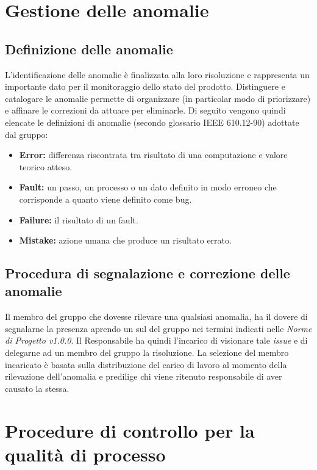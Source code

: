 \documentclass[openany,12pt,a4paper]{report}
\begin{document}
\section{Gestione delle anomalie}

\subsection{Definizione delle anomalie}

L’identificazione delle anomalie è finalizzata alla loro risoluzione e rappresenta un importante dato per il monitoraggio dello stato del prodotto. Distinguere e catalogare le anomalie permette di organizzare (in particolar modo di priorizzare) e affinare le correzioni da attuare per eliminarle. Di seguito
vengono quindi elencate le definizioni di anomalie (secondo glossario IEEE 610.12-90) adottate dal gruppo:

\begin{itemize}
    \item \textbf{Error:} differenza riscontrata tra risultato di una computazione e valore teorico atteso.
    \item \textbf{Fault:} un passo, un processo o un dato definito in modo erroneo che corrisponde a quanto viene definito come bug.
    \item \textbf{Failure:} il risultato di un fault.
    \item \textbf{Mistake:} azione umana che produce un risultato errato.
\end{itemize}

\subsection{Procedura di segnalazione e correzione delle anomalie}

Il membro del gruppo che dovesse rilevare una qualsiasi anomalia, ha il dovere di segnalarne la presenza aprendo un  sul  del gruppo nei termini indicati nelle \textit{Norme di Progetto v1.0.0}. Il Responsabile ha quindi l'incarico di visionare tale \textit{issue} e di delegarne ad un membro del gruppo la risoluzione. La selezione del membro incaricato è basata sulla distribuzione del carico di lavoro al momento della rilevazione dell'anomalia e predilige chi viene ritenuto responsabile di aver causato la stessa.  

\section{Procedure di controllo per la qualità di processo}
\end{document}
